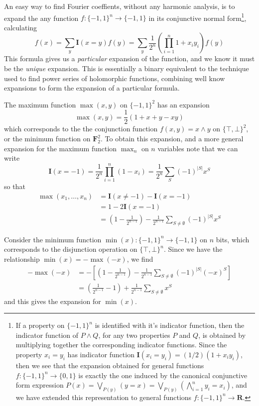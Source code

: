 An easy way to find Fourier coeffients, without any harmonic analysis, is to expand the any function $f: \{ -1, 1 \}^n \to \{ -1, 1 \}$ in its conjunctive normal form\footnote{If a property on $\{ -1, 1 \}^n$ is identified with it's indicator function, then the indicator function of $P \wedge Q$, for any two properties $P$ and $Q$, is obtained by multiplying together the corresponding indicator functions. Since the property $x_i = y_i$ has indicator function $\mathbf{I}(x_i = y_i) = (1/2)(1 + x_iy_i)$, then we see that the expansion obtained for general functions $f: \{ -1, 1 \}^n \to \{ 0, 1 \}$ is exactly the one induced by the canonical conjunctive form expression $P(x) = \bigvee_{P(y)} (y = x) = \bigvee_{P(y)} \left( \bigwedge_{i = 1}^n y_i = x_i \right)$, and we have extended this representation to general functions $f: \{ -1, 1 \}^n \to \mathbf{R}$.}, calculating
%
\[ f(x) = \sum_y \mathbf{I}(x = y) f(y) = \sum_y \frac{1}{2^n} \left( \prod_{i = 1}^n 1 + x_iy_i \right) f(y) \]
%
This formula gives us a {\it particular} expansion of the function, and we know it must be the {\it unique} expansion. This is essentially a binary equivalent to the technique used to find power series of holomorphic functions, combining well know expansions to form the expansion of a particular formula.

\begin{example}
    The maximum function $\max(x,y)$ on $\{ -1, 1 \}^2$ has an expansion
    \[ \max(x,y) = \frac{1}{2} \left( 1 + x + y - xy \right) \]
    which corresponds to the the conjunction function $f(x,y) = x \wedge y$ on $\{ \top, \bot \}^2$, or the minimum function on $\mathbf{F}_2^2$. To obtain this expansion, and a more general expansion for the maximum function $\max_n$ on $n$ variables note that we can write
    \[ \mathbf{I}(x = -1) = \frac{1}{2^n} \prod_{i = 1}^n (1 - x_i) = \frac{1}{2^n} \sum_S (-1)^{|S|} x^S \]
    so that
    \begin{align*}
        \max(x_1, \dots, x_n) &= \mathbf{I}(x \neq -1) - \mathbf{I}(x = -1)\\
        &= 1 - 2 \mathbf{I}(x = -1)\\
        &= \left(1 - \frac{1}{2^{n-1}} \right) - \frac{1}{2^{n-1}} \sum_{S \neq \emptyset} (-1)^{|S|} x^S
    \end{align*}
\end{example}

\begin{example}
    Consider the minimum function $\min(x): \{ -1, 1 \}^n \to \{ -1, 1 \}$ on $n$ bits, which corresponds to the disjunction operation on $\{ \top, \bot \}^n$. Since we have the relationship $\min(x) = - \max(-x)$, we find
    \begin{align*}
        -\max(-x) &= - \left[ \left(1 - \frac{1}{2^{n-1}} \right) - \frac{1}{2^{n-1}} \sum_{S \neq \emptyset} (-1)^{|S|} (-x)^S \right]\\
        &= \left( \frac{1}{2^{n-1}} - 1 \right) + \frac{1}{2^{n-1}} \sum_{S \neq \emptyset} x^S
    \end{align*}
    and this gives the expansion for $\min(x)$.
\end{example}

